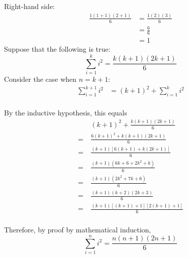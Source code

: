 \documentclass{article}
\numberwithin{subcase}{case}
\begin{document}
\begin{outline}[enumerate]
        Right-hand side:
        \begin{equation}
            \begin{aligned}
                \frac{1(1+1)(2 + 1)}{6} &= \frac{1(2)(3)}{6}  \\
                &= \frac{6}{6}  \\
                &= 1
            \end{aligned}
        \end{equation}
        \2 Suppose that the following is true:
        \begin{equation}
            \sum\limits^{k}_{i=1} i^2 = \frac{k(k + 1)(2k + 1)}{6}
        \end{equation}
        \2 Consider the case when $n = k + 1$:
        \begin{equation}
            \begin{aligned}
                \sum\limits^{k+1}_{i=1} i^2 &= (k+1)^2 + \sum\limits^{k}_{i=1} i^2  \\
            \end{aligned}
        \end{equation}

        By the inductive hypothesis, this equals
        \begin{equation}
            \begin{aligned}
                &(k+1)^2 + \frac{k(k + 1)(2k + 1)}{6}  \\
                =\ & \frac{6(k+1)^2 + k(k + 1)(2k + 1)}{6} \\
                =\ & \frac{(k+1)\left[6(k+1) + k(2k+1)\right]}{6}  \\
                =\ & \frac{(k+1)\left(6k + 6 + 2k^2 + k\right)}{6} \\
                =\ & \frac{(k+1)\left(2k^2 + 7k + 6\right)}{6}  \\
                =\ & \frac{(k+1)(k + 2)(2k+3)}{6}  \\
                =\ & \frac{(k+1)\left[(k + 1)+1\right]\left[2(k+1)+1\right]}{6}  \\
            \end{aligned}
        \end{equation}

        Therefore, by proof by mathematical induction,
        \begin{equation}
            \sum\limits^{n}_{i=1} i^2 = \frac{n(n + 1)(2n + 1)}{6}
        \end{equation} 
    

\end{outline}
\end{document}
